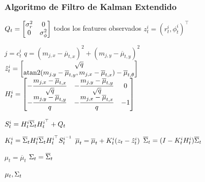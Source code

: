 \begin{frame}
	\frametitle{Algoritmo de Filtro de Kalman Extendido}
	\footnotesize
 	\begin{algorithmic}[1]
		\State
		$ Q_{t} =
			\begin{bmatrix}
				\sigma_{r}^{2} & 0\\
				0 & \sigma_{\phi}^{2}
			\end{bmatrix}
		$
		\For todos los features observados $z_{t}^{i} = (r_{t}^{i}, \phi_{t}^{i})^{\top}$
		
		\State $ j = c_{t}^{i}$
		\State $ q = (m_{j,x}-\overline{\mu}_{t,x})^{2} + (m_{j,y}-\overline{\mu}_{t,y})^{2} $
		\State
		$ \hat{z}_{t}^{i} =
			\begin{bmatrix}
				\sqrt{q}\\
				\operatorname{atan2}(m_{j,y}-\overline{\mu}_{t,y}, m_{j,x}-\overline{\mu}_{t,x}) - \overline{\mu}_{t,\theta}
			\end{bmatrix}
		$
		\State
		$ H_{t}^{i} = 
			\begin{bmatrix}
				-\dfrac{m_{j,x} - \overline{\mu}_{t,x}}{\sqrt{q}} & -\dfrac{m_{j,y} - \overline{\mu}_{t,y}}{\sqrt{q}}  & 0\\
				-\dfrac{m_{j,y} - \overline{\mu}_{t,y}}{q}  & -\dfrac{m_{j,x} - \overline{\mu}_{t,x}}{q}  & -1
			\end{bmatrix}
		$
		
		\State $S_{t}^{i} = H_{t}^{i} \overline{\Sigma}_{t} H_{t}^{i^{\top}} + Q_{t} $

		\State $K_{t}^{i} = \overline{\Sigma}_{t} {H_{t}^{i}} \overline{\Sigma}_{t} H_{t}^{i^{\top}} S_{t}^{i^{-1}} $
		\State $\overline{\mu}_{t} = \overline{\mu}_{t} + K_{t}^{i}(z_{t} - \hat{z}_{t}^{i})$
		\State $\overline{\Sigma}_{t} = (I - K_{t}^{i}H_{t}^{i})\overline{\Sigma}_{t}$
		
		\EndFor
		\State $\mu_{t} = \overline{\mu}_{t}$
		\State $\Sigma_{t} = \overline{\Sigma}_{t}$
		
		\State \Return $\mu_{t}, \Sigma_{t}$
	\end{algorithmic}
	
	
\end{frame}

